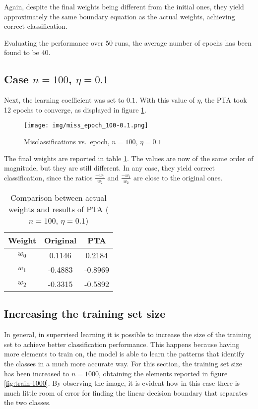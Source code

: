 \documentclass[12pt]{article}
\begin{document}
Again, despite the final weights being different from the initial ones, they yield approximately the same boundary equation as the actual weights, achieving correct classification.

Evaluating the performance over 50 runs, the average number of epochs has been found to be 40.

\subsection{Case $n=100$, $\eta=0.1$}
\label{sec:100-01}

Next, the learning coefficient was set to $0.1$.
With this value of $\eta$, the PTA took 12 epochs to converge, as displayed in figure \ref{fig:100-01-1}.

\begin{figure}[h]
    \centering
    \texttt{[image: img/miss\_epoch\_100-0.1.png]}
    \caption{Misclassifications vs.\ epoch, $n=100$, $\eta=0.1$}
    \label{fig:100-01-1}
\end{figure}

The final weights are reported in table \ref{tab:03}.
The values are now of the same order of magnitude, but they are still different.
In any case, they yield correct classification, since the ratios $\frac{-w_0}{w_2}$ and $\frac{-w_1}{w_2}$ are close to the original ones.

\begin{table}[h]
    \centering
    \begin{tabular}{|c|c|c|}
        \hline
        Weight & \textbf{Original} & \textbf{PTA} \\ 
        \hline
        \hline
        $w_0$ & 0.1146 & 0.2184 \\
        \hline
        $w_1$ & -0.4883 & -0.8969 \\
        \hline
        $w_2$ & -0.3315 & -0.5892 \\
        \hline
    \end{tabular}
    \caption{Comparison between actual weights and results of PTA ($n=100$, $\eta=0.1$)}
    \label{tab:03}
\end{table}

\subsection{Increasing the training set size}

In general, in supervised learning it is possible to increase the size of the training set to achieve better classification performance.
This happens because having more elements to train on, the model is able to learn the patterns that identify the classes in a much more accurate way.
For this section, the training set size has been increased to $n=1000$, obtaining the elements reported in figure \ref{fig:train-1000}.
By observing the image, it is evident how in this case there is much little room of error for finding the linear decision boundary that separates the two classes.
\end{document}
